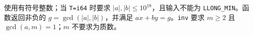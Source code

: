 使用有符号整数；当 \texttt{T=i64} 时要求 $|a|,|b|\le 10^{18}$，且输入不能为
\texttt{LLONG\_MIN}。函数返回非负的 $g=\gcd(|a|,|b|)$，并满足
$ax+by=g$。\texttt{inv} 要求 $m\ge 2$ 且 $\gcd(a,m)=1$；$m$ 不要求为质数。
